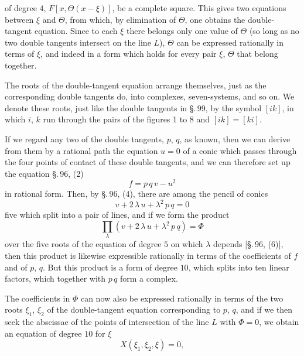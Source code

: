 of degree $4$, $F[x, \Theta(x-\xi)]$, be a complete square. This gives two equations between $\xi$ and $\Theta$, from which, by elimination of $\Theta$, one obtains the double-tangent equation. Since to each $\xi$ there belongs only one value of $\Theta$ (so long as no two double tangents intersect on the line $L$), $\Theta$ can be expressed rationally in terms of $\xi$, and indeed in a form
which holds for every pair $\xi$, $\Theta$ that belong together.

The roots of the double-tangent equation arrange themselves, just as the corresponding double tangents do, into complexes, seven-systems, and so on. We denote these roots, just like the double tangents in \S.\,99, by the symbol $[ik]$, in which $i$, $k$ run through the pairs of the figures 1 to 8 and $[ik] = [ki]$.

If we regard any two of the double tangents, $p$, $q$, as known, then we can derive from them by a rational path the equation $u = 0$ of a conic which passes through the four points of contact of these double tangents, and we can therefore set up the equation \S.\,96, (2)
\[
f = p\,q\,v - u^2
\]
in rational form. Then, by \S.\,96, (4), there are among the pencil of conics
\[
v + 2\,\lambda\,u + \lambda^2\,p\,q = 0
\]
five which split into a pair of lines, and if we form the product
\[
\prod_{\lambda} (v + 2\,\lambda\,u + \lambda^2\,p\,q) = \Phi
\]
over the five roots of the equation of degree $5$ on which $\lambda$ depends [\S.\,96, (6)], then this product is likewise expressible rationally in terms of the coefficients of $f$ and of $p$, $q$. But this product is a form of degree $10$, which splits into ten linear factors, which together with $p\,q$ form a  complex.

The coefficients in $\Phi$ can now also be expressed rationally in terms of the two roots $\xi_1$, $\xi_2$ of the double-tangent equation corresponding to $p$, $q$, and if we then seek the abscissae of the points of intersection of the line $L$ with $\Phi = 0$, we obtain an equation of degree $10$ for $\xi$
\[
X(\xi_1, \xi_2, \xi) = 0,
\]
